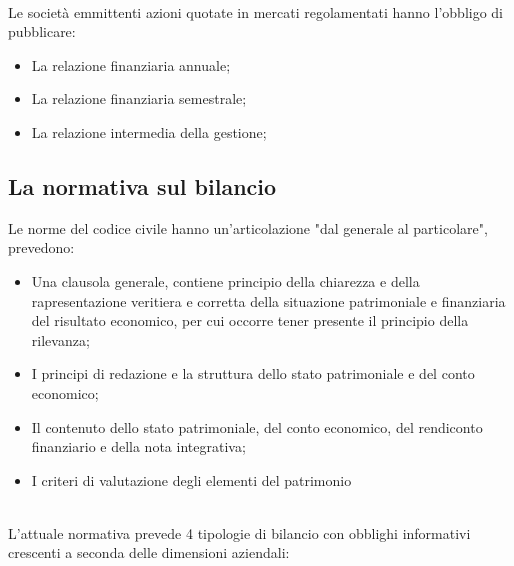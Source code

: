 \documentclass{report}
\begin{document}
\\
Le società emmittenti azioni quotate in mercati regolamentati hanno l'obbligo di pubblicare:
\\
\begin{itemize}
  \item{La relazione finanziaria annuale;}
  \item{La relazione finanziaria semestrale;}
  \item{La relazione intermedia della gestione;}
\end{itemize}

\subsection{La normativa sul bilancio} %
\label{sub:La normativa sul bilancio}
Le norme del codice civile hanno un'articolazione "dal generale al particolare", prevedono:
\\
\begin{itemize}
  \item{Una clausola generale, contiene principio della chiarezza e della rapresentazione veritiera e corretta della situazione patrimoniale e finanziaria del risultato economico, per cui occorre tener presente il principio della rilevanza;}
  \item{I principi di redazione e la struttura dello stato patrimoniale e del conto economico;}
  \item{Il contenuto dello stato patrimoniale, del conto economico, del rendiconto finanziario e della nota integrativa;}
  \item{I criteri di valutazione degli elementi del patrimonio}
\end{itemize}
\\
L'attuale normativa prevede 4 tipologie di bilancio con obblighi informativi crescenti a seconda delle dimensioni aziendali:
\\
\end{document}
